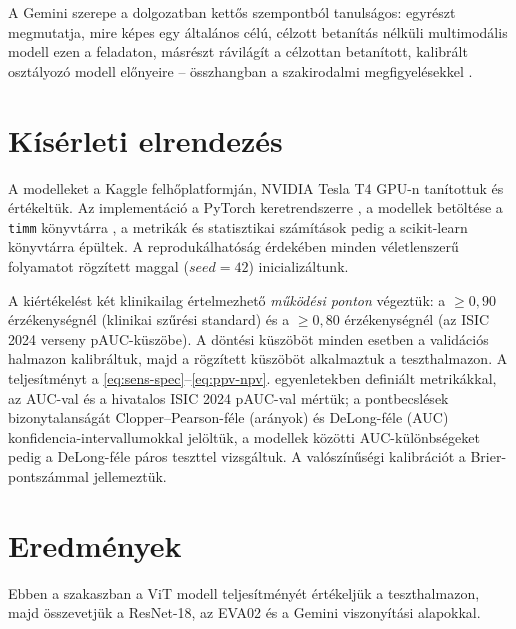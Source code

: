 A Gemini szerepe a dolgozatban kettős szempontból tanulságos: egyrészt
megmutatja, mire képes egy általános célú, célzott betanítás nélküli multimodális
modell ezen a feladaton, másrészt rávilágít a célzottan betanított, kalibrált
osztályozó modell előnyeire -- összhangban a szakirodalmi megfigyelésekkel
\cite{cirone2024llm}.

\section{Kísérleti elrendezés}

A modelleket a Kaggle felhőplatformján, NVIDIA Tesla T4 GPU-n tanítottuk és
értékeltük. Az implementáció a PyTorch keretrendszerre \cite{paszke2019pytorch}, a
modellek betöltése a \texttt{timm} könyvtárra \cite{wightman2019timm}, a metrikák
és statisztikai számítások pedig a scikit-learn könyvtárra
\cite{pedregosa2011sklearn} épültek. A reprodukálhatóság érdekében minden
véletlenszerű folyamatot rögzített maggal ($seed = 42$) inicializáltunk.

A kiértékelést két klinikailag értelmezhető \textit{működési ponton} végeztük: a
$\ge 0{,}90$ érzékenységnél (klinikai szűrési standard) és a $\ge 0{,}80$
érzékenységnél (az ISIC 2024 verseny pAUC-küszöbe). A döntési küszöböt minden
esetben a validációs halmazon kalibráltuk, majd a rögzített küszöböt alkalmaztuk
a teszthalmazon. A teljesítményt a \ref{eq:sens-spec}--\ref{eq:ppv-npv}.
egyenletekben definiált metrikákkal, az AUC-val és a hivatalos ISIC 2024 pAUC-val
mértük; a pontbecslések bizonytalanságát Clopper--Pearson-féle (arányok) és
DeLong-féle (AUC) konfidencia-intervallumokkal \cite{sun2014delong} jelöltük, a
modellek közötti AUC-különbségeket pedig a DeLong-féle páros teszttel
vizsgáltuk. A valószínűségi kalibrációt a Brier-pontszámmal
\cite{guo2017calibration} jellemeztük.

\section{Eredmények}

Ebben a szakaszban a ViT modell teljesítményét értékeljük a teszthalmazon, majd
összevetjük a ResNet-18, az EVA02 és a Gemini viszonyítási alapokkal.

